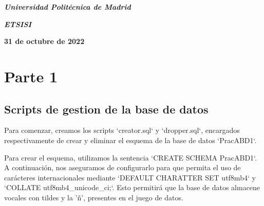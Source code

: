 \documentclass[a4paper, 11pt, oneside]{article} %
\newcommand{\plogo}{\fbox{$\mathcal{LCDPM}$}} %
\begin{document}
\begin{titlepage}
	\vspace{1.0\baselineskip} %
	
	\textit{\textbf{Universidad Politécnica de Madrid \\}} %

	\vspace{0.25\baselineskip} %

	\textit{\textbf{ETSISI}} %
	
	\vfill %
	
	
	\textbf{31 de octubre de 2022} %
	
	\vspace{0.5\baselineskip} %

	\plogo %

\end{titlepage}


\renewcommand*\contentsname{Índice} %

\setcounter{tocdepth}{3} %

\tableofcontents %

\newpage

	
\section{Parte 1}

\subsection{Scripts de gestion de la base de datos}

Para comenzar, creamos los scripts `creator.sql` y `dropper.sql`, encargados respectivamente de crear y eliminar el esquema de la base de datos `PracABD1`.

Para crear el esquema, utilizamos la sentencia `CREATE SCHEMA PracABD1`. A continuación, nos aseguramos de configurarlo para que permita el uso de carácteres internacionales mediante `DEFAULT CHARATTER SET utf8mb4` y `COLLATE utf8mb4_unicode_ci;`. Esto permitirá que la base de datos almacene vocales con tildes y la 'ñ', presentes en el juego de datos.
\end{document}
